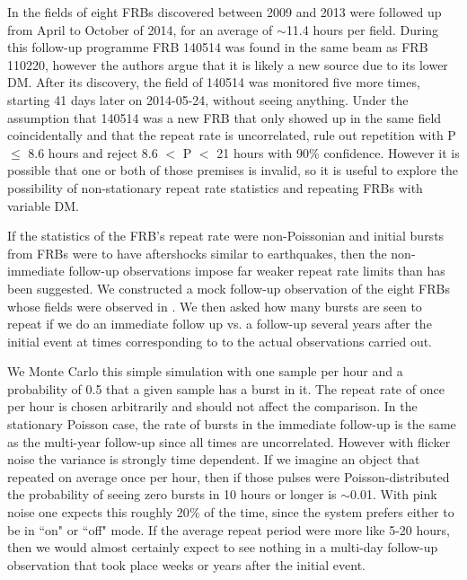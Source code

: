 \documentclass[useAMS,usenatbib]{mn2e}
\begin{document}
In \cite{2015MNRAS.454..457P}
the fields of eight FRBs discovered between 2009 and 2013
were followed up from April to October of 2014, for an average 
of $\sim$11.4 hours per field. During this follow-up programme 
FRB 140514 was found in the same beam as FRB 110220, however
the authors argue that it is likely a new source due to its lower DM. 
After its discovery, the field of 140514 was monitored 
five more times, starting 41 days later on 2014-05-24, without seeing anything.
Under the assumption that 140514 was a new FRB 
that only showed up in the same field 
coincidentally and that the repeat rate is uncorrelated,
 \cite{2015MNRAS.454..457P} rule out repetition with P $\le$ 8.6 
hours and reject 8.6 $<$ P $<$ 21 hours with 90$\%$ confidence.
However it is possible that one or both of those premises 
is invalid, so it is useful to explore the possibility of non-stationary 
repeat rate statistics and repeating FRBs with variable DM. 

If the statistics of the FRB's repeat rate were
non-Poissonian and initial bursts from FRBs were to have aftershocks
similar to earthquakes, then the non-immediate follow-up observations 
impose far weaker repeat rate limits than has been suggested. We 
constructed a mock follow-up observation of the eight FRBs whose
fields were observed in \cite{2015MNRAS.454..457P}. We then 
asked how many bursts are seen to repeat if we do an immediate
follow up vs. a follow-up several years after the initial event 
at times corresponding to 
to the actual observations carried out. 

We Monte Carlo this 
simple simulation with one sample per hour and a probability of 0.5 
that a given sample has a burst in it. The repeat rate of once per hour
is chosen arbitrarily and should not affect the comparison. 
In the stationary Poisson case, the rate of bursts in 
the immediate follow-up is the same as the multi-year follow-up 
since all times are 
uncorrelated. However with flicker noise 
the variance is strongly time dependent. If we imagine an object that 
repeated on average once per hour, then if those pulses were Poisson-distributed 
the probability of seeing zero bursts in 10 hours or longer is $\sim$0.01. With 
pink noise one expects this roughly 20$\%$ of the time, since the system 
prefers either to be in ``on" or ``off" mode. If the average repeat period were more 
like 5-20 hours, then we would almost certainly expect to see nothing in a multi-day follow-up 
observation that took place weeks or years after the initial event.
\end{document}

